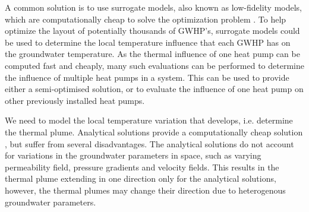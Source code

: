 \documentclass{article} %
\begin{document}
A common solution is to use surrogate models, also known as low-fidelity models, which are computationally cheap to solve the optimization problem \cite{Sbai2019, Nagoor2019, Robinson2012}. 
To help optimize the layout of potentially thousands of GWHP's, surrogate models could be used to determine the local temperature influence that each GWHP has on the groundwater temperature. 
As the thermal influence of one heat pump can be computed fast and cheaply, many such evaluations can be performed to determine the influence of multiple heat pumps in a system. 
This can be used to provide either a semi-optimised solution, or to evaluate the influence of one heat pump on other previously installed heat pumps. 

We need to model the local temperature variation that develops, i.e. determine the thermal plume. 
Analytical solutions provide a computationally cheap solution \cite{Pophillat2020}, but suffer from several disadvantages. 
The analytical solutions do not account for variations in the groundwater parameters in space, such as varying permeability field, pressure gradients and velocity fields. 
This results in the thermal plume extending in one direction only for the analytical solutions, however, the thermal plumes may change their direction due to heterogenous groundwater parameters. 
\end{document}
